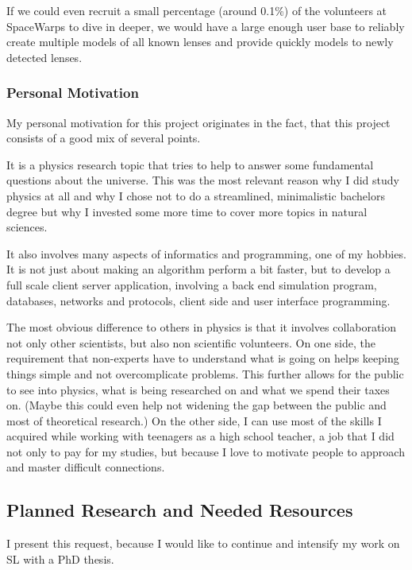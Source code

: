 \documentclass[11pt]{article}
\begin{document}
If we could even recruit a small percentage (around 0.1\%) of the volunteers at SpaceWarps to dive in deeper, we would have a large enough user base to reliably create multiple models of all known lenses and provide quickly models to newly detected lenses.



\subsubsection{Personal Motivation}

My personal motivation for this project originates in the fact, that this project consists of a good mix of several points.

It is a physics research topic that tries to help to answer some fundamental questions about the universe.
This was the most relevant reason why I did study physics at all and why I chose not to do a streamlined, minimalistic bachelors degree but why I invested some more time to cover more topics in natural sciences.

It also involves many aspects of informatics and programming, one of my hobbies.
It is not just about making an algorithm perform a bit faster, but to develop a full scale client server application, involving a back end simulation program, databases, networks and protocols, client side and user interface programming.

The most obvious difference to others in physics is that it involves collaboration not only other scientists, but also non scientific volunteers.
On one side, the requirement that non-experts have to understand what is going on helps keeping things simple and not overcomplicate problems.
This further allows for the public to see into physics, what is being researched on and what we spend their taxes on.
(Maybe this could even help not widening the gap between the public and most of theoretical research.)
On the other side, I can use most of the skills I acquired while working with teenagers as a high school teacher, a job that I did not only to pay for my studies, but because I love to motivate people to approach and master difficult connections.


\subsection{Planned Research and Needed Resources}

I present this request, because I would like to continue and intensify my work on SL with a PhD thesis.
\end{document}
